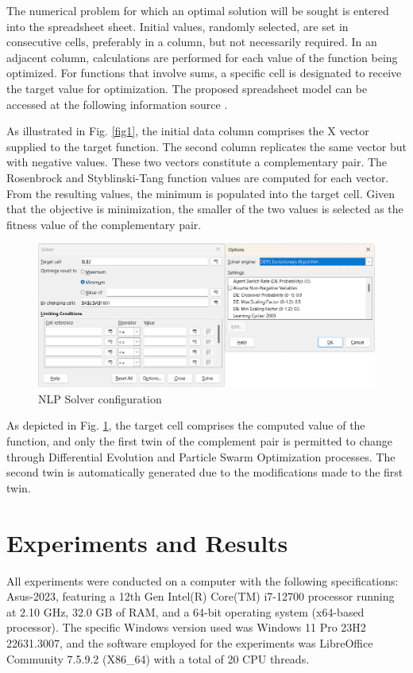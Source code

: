 \documentclass[runningheads]{llncs}
\begin{document}
The numerical problem for which an optimal solution will be sought is entered into the spreadsheet sheet. Initial values, randomly selected, are set in consecutive cells, preferably in a column, but not necessarily required. In an adjacent column, calculations are performed for each value of the function being optimized. For functions that involve sums, a specific cell is designated to receive the target value for optimization. The proposed spreadsheet model can be accessed at the following information source \cite{Balabanov-2024}.

As illustrated in Fig. \ref{fig1}, the initial data column comprises the X vector supplied to the target function. The second column replicates the same vector but with negative values. These two vectors constitute a complementary pair. The Rosenbrock and Styblinski-Tang function values are computed for each vector. From the resulting values, the minimum is populated into the target cell. Given that the objective is minimization, the smaller of the two values is selected as the fitness value of the complementary pair.

\begin{figure}[h]
\includegraphics[width=\textwidth]{fig2.png}
\caption{NLP Solver configuration} \label{fig2}
\end{figure}

As depicted in Fig. \ref{fig2}, the target cell comprises the computed value of the function, and only the first twin of the complement pair is permitted to change through Differential Evolution and Particle Swarm Optimization processes. The second twin is automatically generated due to the modifications made to the first twin.

\section{Experiments and Results}

All experiments were conducted on a computer with the following specifications: Asus-2023, featuring a 12th Gen Intel(R) Core(TM) i7-12700 processor running at 2.10 GHz, 32.0 GB of RAM, and a 64-bit operating system (x64-based processor). The specific Windows version used was Windows 11 Pro 23H2 22631.3007, and the software employed for the experiments was LibreOffice Community 7.5.9.2 (X86\_64) with a total of 20 CPU threads.
\end{document}
